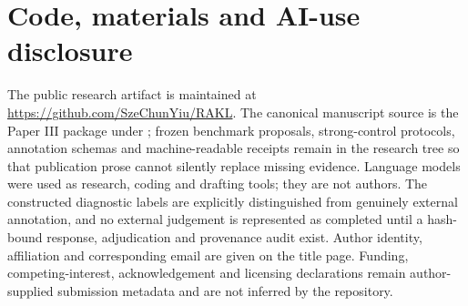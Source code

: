 \documentclass[11pt]{article}
\begin{document}
\section*{Code, materials and AI-use disclosure}
The public research artifact is maintained at \url{https://github.com/SzeChunYiu/RAKL}. The canonical manuscript source is the Paper III package under ; frozen benchmark proposals, strong-control protocols, annotation schemas and machine-readable receipts remain in the research tree so that publication prose cannot silently replace missing evidence. Language models were used as research, coding and drafting tools; they are not authors. The constructed diagnostic labels are explicitly distinguished from genuinely external annotation, and no external judgement is represented as completed until a hash-bound response, adjudication and provenance audit exist. Author identity, affiliation and corresponding email are given on the title page. Funding, competing-interest, acknowledgement and licensing declarations remain author-supplied submission metadata and are not inferred by the repository.


\end{document}
